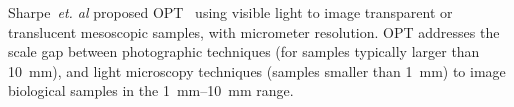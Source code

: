 \documentclass[times, twoside, watermark]{zHenriquesLab-StyleBioRxiv}
\begin{document}
%



Sharpe~\emph{et. al} proposed \gls*{OPT}~\cite{sharpeOpticalProjectionTomography2002}
using visible light to image transparent or translucent mesoscopic samples, with micrometer resolution.
\gls*{OPT} addresses the scale gap between photographic techniques (for samples typically larger than \SI{10}{\milli\meter}), and light microscopy techniques (samples smaller than \SI{1}{\milli\meter}) to image biological samples in the \SIrange{1}{10}{\milli\meter} range.
\end{document}
